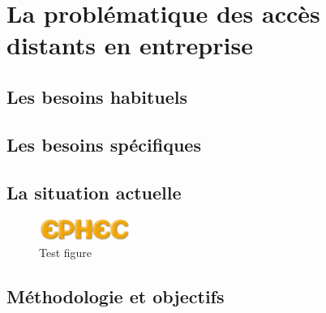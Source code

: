 \part{La problématique des accès distants en entreprise}
\chapter{Les besoins habituels}
\chapter{Les besoins spécifiques}
\chapter{La situation actuelle}
\begin{figure}
\includegraphics{ephec.png}
\caption{Test figure}
\end{figure}
\chapter{Méthodologie et objectifs}